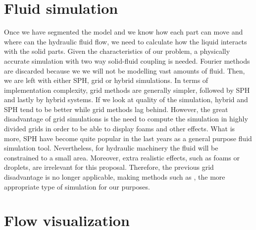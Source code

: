 \section{Fluid simulation}

Once we have segmented the model and we know how each part can move and where can the hydraulic fluid flow, we need to calculate how the liquid interacts with the solid parts.
Given the characteristics of our problem, a physically accurate simulation with two way solid-fluid coupling is needed.
Fourier methods are discarded because we we will not be modelling vast amounts of fluid.
Then, we are left with either SPH, grid or hybrid simulations.
In terms of implementation complexity, grid methods are generally simpler, followed by SPH and lastly by hybrid systems.
If we look at quality of the simulation, hybrid and SPH tend to be better while grid methods lag behind.
However, the great disadvantage of grid simulations is the need to compute the simulation in highly divided grids in order to be able to display foams and other effects.
What is more, SPH have become quite popular in the last years as a general purpose fluid simulation tool.
Nevertheless, for hydraulic machinery the fluid will be constrained to a small area.
Moreover, extra realistic effects, such as foams or droplets, are irrelevant for this proposal.
Therefore, the previous grid disadvantage is no longer applicable, making methods such as \cite{Carlson2004}, the more appropriate type of simulation for our purposes.


\section{Flow visualization}


